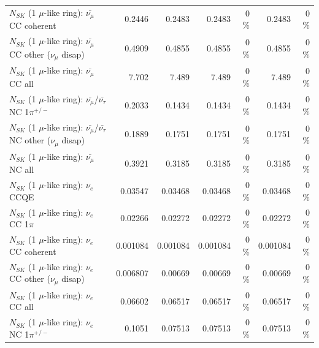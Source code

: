 \begin{table}
\begin{tabular}{| l | r | r | r  r | r  r |}
                       $N_{SK}$ (1 $\mu$-like ring): $\bar{\nu_\mu}$ CC coherent &          0.2446 &          0.2483 &          0.2483 &        0 \%  &          0.2483 &        0 \%  \\ 
        $N_{SK}$ (1 $\mu$-like ring): $\bar{\nu_\mu}$ CC other ($\nu_\mu$ disap) &          0.4909 &          0.4855 &          0.4855 &        0 \%  &          0.4855 &        0 \%  \\ 
                          $N_{SK}$ (1 $\mu$-like ring): $\bar{\nu_{\mu}}$ CC all &           7.702 &           7.489 &           7.489 &        0 \%  &           7.489 &        0 \%  \\ 
\hline
  $N_{SK}$ (1 $\mu$-like ring): $\bar{\nu_\mu}$/$\bar{\nu_\tau}$ NC 1$\pi^{+/-}$ &          0.2033 &          0.1434 &          0.1434 &        0 \%  &          0.1434 &        0 \%  \\ 
$N_{SK}$ (1 $\mu$-like ring): $\bar{\nu_\mu}$/$\bar{\nu_\tau}$ NC other ($\nu_\mu$ disap) &          0.1889 &          0.1751 &          0.1751 &        0 \%  &          0.1751 &        0 \%  \\ 
                          $N_{SK}$ (1 $\mu$-like ring): $\bar{\nu_{\mu}}$ NC all &          0.3921 &          0.3185 &          0.3185 &        0 \%  &          0.3185 &        0 \%  \\ 
\hline
\hline
\hline
                                      $N_{SK}$ (1 $\mu$-like ring): $\nu_e$ CCQE &         0.03547 &         0.03468 &         0.03468 &        0 \%  &         0.03468 &        0 \%  \\ 
                                 $N_{SK}$ (1 $\mu$-like ring): $\nu_e$ CC 1$\pi$ &         0.02266 &         0.02272 &         0.02272 &        0 \%  &         0.02272 &        0 \%  \\ 
                               $N_{SK}$ (1 $\mu$-like ring): $\nu_e$ CC coherent &        0.001084 &        0.001084 &        0.001084 &        0 \%  &        0.001084 &        0 \%  \\ 
                $N_{SK}$ (1 $\mu$-like ring): $\nu_e$ CC other ($\nu_\mu$ disap) &        0.006807 &         0.00669 &         0.00669 &        0 \%  &         0.00669 &        0 \%  \\ 
                                  $N_{SK}$ (1 $\mu$-like ring): $\nu_{e}$ CC all &         0.06602 &         0.06517 &         0.06517 &        0 \%  &         0.06517 &        0 \%  \\ 
\hline
                           $N_{SK}$ (1 $\mu$-like ring): $\nu_e$ NC 1$\pi^{+/-}$ &          0.1051 &         0.07513 &         0.07513 &        0 \%  &         0.07513 &        0 \%  \\ 

\end{tabular}
\end{table}

